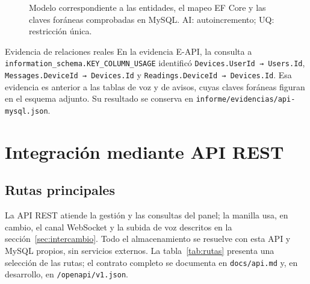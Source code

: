 \documentclass[10pt,a4paper]{article}
\newcommand{\code}[1]{{\small\urlstyle{tt}\nolinkurl{#1}}}
\newcommand{\newsection}[1]{\clearpage\section{#1}}
\begin{document}
\begin{figure}[ht]
{}
\caption{Modelo correspondiente a las entidades, el mapeo EF Core y las claves foráneas comprobadas en MySQL. AI: autoincremento; UQ: restricción única.}
\label{fig:er}
\end{figure}

\begin{insight}{Evidencia de relaciones reales}
En la evidencia E-API, la consulta a \code{information_schema.KEY_COLUMN_USAGE} identificó \code{Devices.UserId → Users.Id}, \code{Messages.DeviceId → Devices.Id} y \code{Readings.DeviceId → Devices.Id}. Esa evidencia es anterior a las tablas de voz y de avisos, cuyas claves foráneas figuran en el esquema adjunto. Su resultado se conserva en \code{informe/evidencias/api-mysql.json}.
\end{insight}

\newsection{Integración mediante API REST}
\label{sec:api}
\subsection{Rutas principales}
La API REST atiende la gestión y las consultas del panel; la manilla usa, en cambio, el canal WebSocket y la subida de voz descritos en la sección~\ref{sec:intercambio}. Todo el almacenamiento se resuelve con esta API y MySQL propios, sin servicios externos. La tabla~\ref{tab:rutas} presenta una selección de las rutas; el contrato completo se documenta en \code{docs/api.md} y, en desarrollo, en \code{/openapi/v1.json}.
\end{document}
